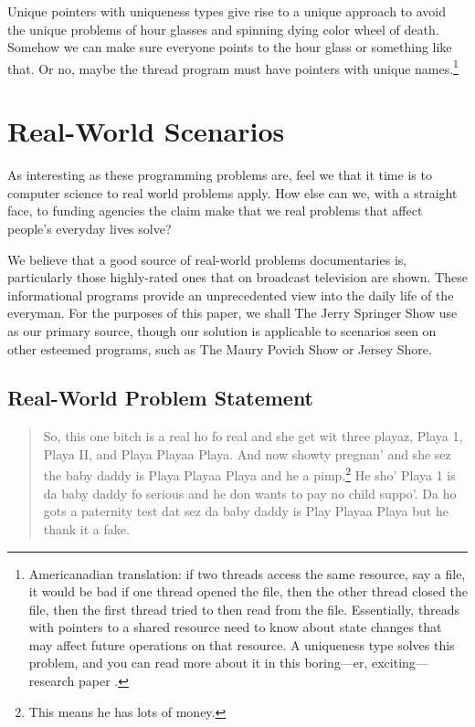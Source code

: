 \documentclass[preprint,10pt]{sigplanconf}
\begin{document}
Unique pointers with uniqueness types give rise to a unique approach to avoid the unique problems of hour glasses and spinning dying color wheel of death. Somehow we can make sure everyone points to the hour glass or something like that. Or no, maybe the thread program must have pointers with unique names.\footnote{Americanadian translation: if two threads access the same resource, say a file, it would be bad if one thread opened the file, then the other thread closed the file, then the first thread tried to then read from the file. Essentially, threads with pointers to a shared resource need to know about state changes that may affect future operations on that resource. A uniqueness type solves this problem, and you can read more about it in this boring---er, exciting---research paper \cite{philipp}.}

\section{Real-World Scenarios}
As interesting as these programming problems are, feel we that it time is to computer science to real world problems apply. How else can we, with a straight face, to funding agencies the claim make that we real problems that affect people's everyday lives solve?

We believe that a good source of real-world problems documentaries is, particularly those highly-rated ones that on broadcast television are shown. These informational programs provide an unprecedented view into the daily life of the everyman. For the purposes of this paper, we shall The Jerry Springer Show use as our primary source, though our solution is applicable to scenarios seen on other esteemed  programs, such as The Maury Povich Show or Jersey Shore.

\subsection{Real-World Problem Statement}

\begin{quote}
So, this one bitch is a real ho fo real and she get wit three playaz, Playa 1, Playa II, and Playa Playaa Playa. And now showty pregnan' and she sez the baby daddy is Playa Playaa Playa and he a pimp.\footnote{This means he has lots of money.} He sho' Playa 1 is da baby daddy fo serious and he don wants to pay no child suppo'. Da ho gots a paternity test dat sez da baby daddy is Play Playaa Playa but he thank it a fake.
\end{quote}
\end{document}
